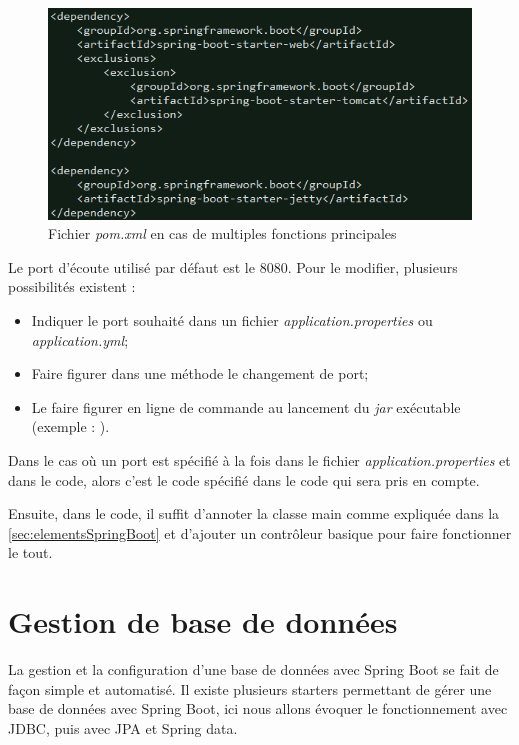 \documentclass{polytech/polytech}
\begin{document}
\begin{figure}
	\includegraphics[scale=0.8]{images/webBuildSpringBoot}
	\caption{Fichier \textit{pom.xml} en cas de multiples fonctions principales}
	\label{fig:webBuildSpringBoot}
\end{figure}

Le port d’écoute utilisé par défaut est le 8080. Pour le modifier, plusieurs possibilités existent :

\begin{itemize}
	\item Indiquer le port souhaité dans un fichier \textit{application.properties} ou \textit{application.yml};
	\item Faire figurer dans une méthode le changement de port;
	\item Le faire figurer en ligne de commande au lancement du \textit{jar} exécutable (exemple : ).
\end{itemize}

Dans le cas où un port est spécifié à la fois dans le fichier \textit{application.properties} et dans le code, alors c’est le code spécifié dans le code qui sera pris en compte.

Ensuite, dans le code, il suffit d’annoter la classe main comme expliquée dans la \autoref{sec:elementsSpringBoot} et d’ajouter un contrôleur basique pour faire fonctionner le tout. 

\section{Gestion de base de données}

La gestion et la configuration d’une base de données avec Spring Boot se fait de façon simple et automatisé. Il existe plusieurs starters permettant de gérer une base de données avec Spring Boot, ici nous allons évoquer le fonctionnement avec JDBC, puis avec JPA et Spring data.
\end{document}
